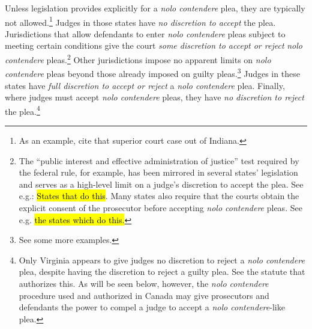 
Unless legislation provides explicitly for a \textit{nolo contendere} plea, they are typically not allowed.\footnote{As an example, cite that superior court case out of Indiana.} Judges in those states have \textit{no discretion to accept} the plea. Jurisdictions that allow defendants to enter \textit{nolo contendere} pleas subject to meeting certain conditions give the court \textit{some discretion to accept or reject} \textit{nolo contendere} pleas.\footnote{The ``public interest and effective administration of justice” test required by the federal rule, for example, has been mirrored in several states' legislation and serves as a high-level limit on a judge's discretion to accept the plea. See e.g.: \hl{States that do this}. Many states also require that the courts obtain the explicit consent of the prosecutor before accepting \textit{nolo contendere} pleas. See e.g. \hl{the states which do this.}} Other jurisdictions impose no apparent limits on \textit{nolo contendere} pleas beyond those already imposed on guilty pleas.\footnote{See some more examples.} Judges in these states have \textit{full discretion to accept or reject} a \textit{nolo contendere} plea. Finally, where judges must accept \textit{nolo contendere} pleas, they have \textit{no discretion to reject} the plea.\footnote{Only Virginia appears to give judges no discretion to reject a \textit{nolo contendere} plea, despite having the discretion to reject a guilty plea. See the statute that authorizes this. As will be seen below, however, the \textit{nolo contendere} procedure used and authorized in Canada may give prosecutors and defendants the power to compel a judge to accept a \textit{nolo contendere}-like plea.}

